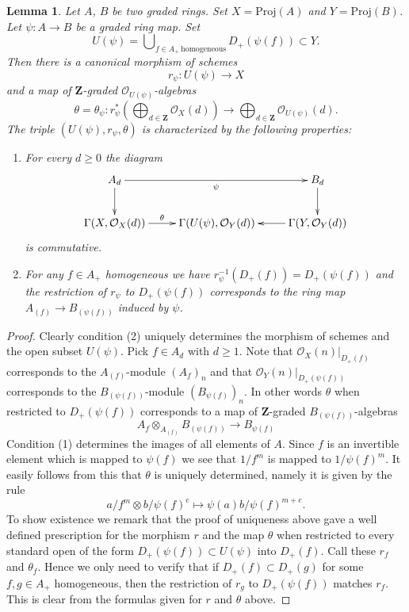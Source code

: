 \documentclass{stacks-project}
\theoremstyle{plain}
\newtheorem{lemma}[subsection]{Lemma}
\theoremstyle{definition}
\theoremstyle{remark}
\numberwithin{equation}{subsection}
\begin{document}
\begin{lemma}
\label{lemma-morphism-proj}
Let $A$, $B$ be two graded rings.
Set $X = \text{Proj}(A)$ and $Y = \text{Proj}(B)$.
Let $\psi : A \to B$ be a graded ring map.
Set
$$
U(\psi)
=
\bigcup\nolimits_{f \in A_{+}\ \text{homogeneous}} D_{+}(\psi(f))
\subset Y.
$$
Then there is a canonical morphism of schemes
$$
r_\psi :
U(\psi)
\longrightarrow
X
$$
and a map of $\mathbf{Z}$-graded $\mathcal{O}_{U(\psi)}$-algebras
$$
\theta = \theta_\psi :
r_\psi^*\left(
\bigoplus\nolimits_{d \in \mathbf{Z}} \mathcal{O}_X(d)
\right)
\longrightarrow
\bigoplus\nolimits_{d \in \mathbf{Z}} \mathcal{O}_{U(\psi)}(d).
$$
The triple $(U(\psi), r_\psi, \theta)$ is
characterized by the following properties:
\begin{enumerate}
\item For every $d \geq 0$ the diagram
$$
\xymatrix{
A_d \ar[d] \ar[rr]_{\psi} & &
B_d \ar[d] \\
\Gamma(X, \mathcal{O}_X(d)) \ar[r]^-\theta &
\Gamma(U(\psi), \mathcal{O}_Y(d)) &
\Gamma(Y, \mathcal{O}_Y(d)) \ar[l]
}
$$
is commutative.
\item For any $f \in A_{+}$ homogeneous
we have $r_\psi^{-1}(D_{+}(f)) = D_{+}(\psi(f))$ and
the restriction of $r_\psi$ to $D_{+}(\psi(f))$
corresponds to the ring map
$A_{(f)} \to B_{(\psi(f))}$ induced by $\psi$.
\end{enumerate}
\end{lemma}

\begin{proof}
Clearly condition (2) uniquely determines the morphism of schemes
and the open subset $U(\psi)$. Pick $f \in A_d$ with $d \geq 1$.
Note that
$\mathcal{O}_X(n)|_{D_{+}(f)}$ corresponds to the
$A_{(f)}$-module $(A_f)_n$ and that
$\mathcal{O}_Y(n)|_{D_{+}(\psi(f))}$ corresponds to the
$B_{(\psi(f))}$-module $(B_{\psi(f)})_n$. In other words $\theta$
when restricted to $D_{+}(\psi(f))$ corresponds to a map of
$\mathbf{Z}$-graded $B_{(\psi(f))}$-algebras
$$
A_f \otimes_{A_{(f)}} B_{(\psi(f))}
\longrightarrow
B_{\psi(f)}
$$
Condition (1) determines the images of all elements of $A$.
Since $f$ is an invertible element which is mapped to $\psi(f)$
we see that $1/f^m$ is mapped to $1/\psi(f)^m$. It easily follows
from this that $\theta$ is uniquely determined, namely it is
given by the rule
$$
a/f^m \otimes b/\psi(f)^e \longmapsto \psi(a)b/\psi(f)^{m + e}.
$$
To show existence we remark that the proof of uniqueness above gave
a well defined prescription for the morphism $r$ and the map $\theta$
when restricted to every standard open of the form
$D_{+}(\psi(f)) \subset U(\psi)$ into $D_{+}(f)$.
Call these $r_f$ and $\theta_f$.
Hence we only need to verify that if $D_{+}(f) \subset D_{+}(g)$
for some $f, g \in A_{+}$ homogeneous, then the restriction of
$r_g$ to $D_{+}(\psi(f))$ matches $r_f$. This is clear from the
formulas given for $r$ and $\theta$ above.
\end{proof}
\end{document}
